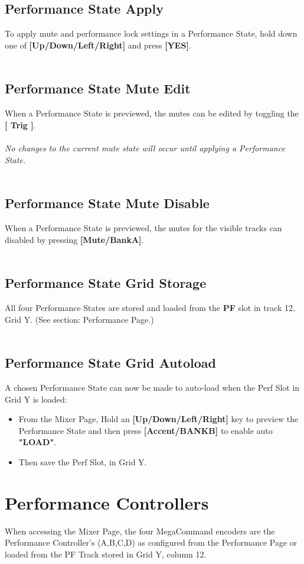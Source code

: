 \subsection{Performance State Apply}
To apply mute and performance lock settings in a Performance State, hold down one of \textbf{[Up/Down/Left/Right]} and press \textbf{[YES]}.
\\\\
\subsection{Performance State Mute Edit}
When a Performance State is previewed, the mutes can be edited by toggling the \textbf{[ Trig ]}.\\\\\textit{No changes to the current mute state will occur until applying a  Performance State.}
\\\\
\subsection{Performance State Mute Disable}
When a Performance State is previewed, the mutes for the visible tracks can disabled by pressing \textbf{[Mute/BankA]}.\\\\
\subsection{Performance State Grid Storage}
All four Performance States are stored and loaded from the \textbf{PF} slot in track 12, Grid Y. (See section: Performance Page.)
\\\\
\subsection{Performance State Grid Autoload}
     A chosen Performance State can now be made to auto-load when the Perf Slot in Grid Y is loaded:
\begin{itemize}
    \item From the Mixer Page, Hold an \textbf{[Up/Down/Left/Right]} key to preview the Performance State and then press \textbf{[Accent/BANKB]} to enable auto \textbf{"LOAD"}.
    \item Then save the Perf Slot, in Grid Y.
\end{itemize}
\newpage
\section{Performance Controllers}
When accessing the Mixer Page, the four MegaCommand encoders are the Performance Controller's (A,B,C,D) as configured from the Performance Page or loaded from the PF Track stored in Grid Y, column 12.
\\\\
